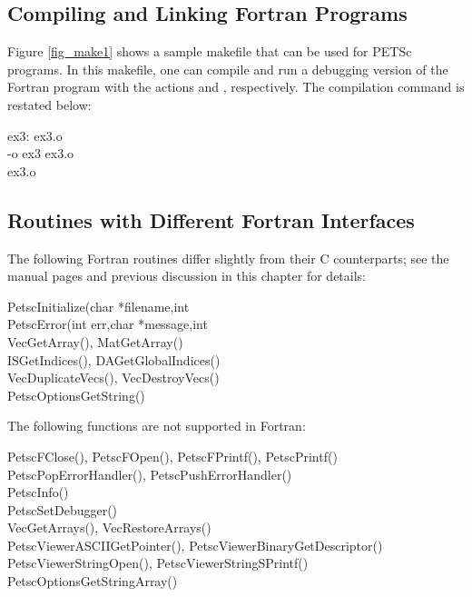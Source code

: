 \subsection{Compiling and Linking Fortran Programs}
\label{sec_fortcompile}

Figure \ref{fig_make1} shows a sample makefile that can be used for
PETSc programs.  In this makefile, one can compile and run a debugging version
of the Fortran program  with the actions    and
 , respectively. The compilation command is restated below:
\begin{tabbing}
   ex3: ex3.o \\
    -o ex3 ex3.o \\
    ex3.o
\end{tabbing}

\subsection{Routines with Different Fortran Interfaces}
\label{sec_fortran_exceptions}

The following Fortran routines differ slightly from their C counterparts; see the 
manual pages and previous discussion in this chapter for details:
\begin{tabbing}
 PetscInitialize(char *filename,int \\
 PetscError(int err,char *message,int \\
 VecGetArray(), MatGetArray()\\
 ISGetIndices(), DAGetGlobalIndices()\\
 VecDuplicateVecs(), VecDestroyVecs()\\
 PetscOptionsGetString()
\end{tabbing}
The following functions are not supported in Fortran:
\begin{tabbing}
 PetscFClose(), PetscFOpen(), PetscFPrintf(), PetscPrintf()\\
 PetscPopErrorHandler(), PetscPushErrorHandler()\\
 PetscInfo()\\
 PetscSetDebugger()\\
 VecGetArrays(), VecRestoreArrays()\\
 PetscViewerASCIIGetPointer(), PetscViewerBinaryGetDescriptor()\\
 PetscViewerStringOpen(), PetscViewerStringSPrintf()\\
 PetscOptionsGetStringArray()
\end{tabbing}

